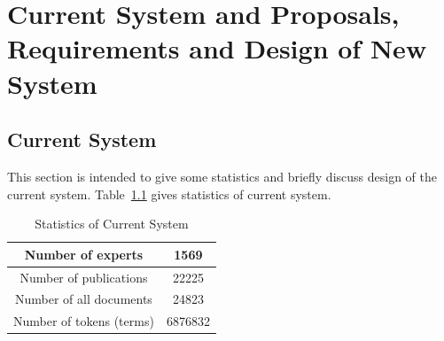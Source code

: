 
\chapter{Current System and Proposals, Requirements and Design of New System}\label{sec:currentsystemandproposals}

\section{Current System}\label{sec:currentsystem}
This section is intended to give some statistics and briefly discuss design of the current system. Table~\ref{table:currentstats} gives statistics 
of current system.
\begin{table}
\centering
\begin{tabular}{|c|c|}
\hline Number of experts & 1569 \\
\hline Number of publications & 22225 \\
\hline Number of all documents   & 24823 \\ 
\hline Number of tokens (terms) & 6876832 \\
\hline
\end{tabular}
\caption{Statistics of Current System} \label{table:currentstats}
\end{table}

